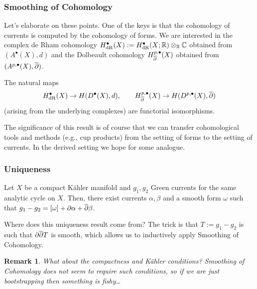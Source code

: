 \documentclass[11pt]{beamer}
\newtheorem{remark}{Remark}
\begin{document}
\begin{frame}
\frametitle{Smoothing of Cohomology}
Let's elaborate on these points. One of the keys is that the cohomology of currents is computed by the cohomology of forms. We are interested in the complex de Rham cohomology $H_{\operatorname{dR}}^{\bullet}(X):=H_{\operatorname{dR}}^{\bullet}(X;\mathbb{R})\otimes_{\mathbb{R}}\mathbb{C}$ obtained from $(A^{\bullet}(X),d)$ and the Dolbeault cohomology $H_{\overline{\partial}}^{p,\bullet}(X)$ obtained from $(A^{p,\bullet}(X),\overline{\partial})$. 

\begin{theorem}
The natural maps 
$$H_{\operatorname{dR}}^{\bullet}(X)\to H(D^{\bullet}(X),d),\qquad H_{\overline{\partial}}^{p,\bullet}(X)\to H(D^{p,\bullet}(X),\overline{\partial})$$
(arising from the underlying complexes) are functorial isomorphisms.
\end{theorem}

The significance of this result is of course that we can transfer cohomological tools and methods (e.g., cup products) from the setting of forms to the setting of currents. In the derived setting we hope for some analogue.
\end{frame}

\begin{frame}
\frametitle{Uniqueness}
\begin{theorem}
Let $X$ be a compact K\"{a}hler manifold and $g_1,g_2$ Green currents for the same analytic cycle on $X$. Then, there exist currents $\alpha,\beta$ and a smooth form $\omega$ such that $g_1-g_2=[\omega]+\partial\alpha+\overline{\partial}\beta$.
\end{theorem}

Where does this uniqueness result come from? The trick is that $T:=g_1-g_2$ is such that $\partial\overline{\partial}T$ is smooth, which allows us to inductively apply Smoothing of Cohomology. 

\begin{remark}
What about the compactness and K\"{a}hler conditions? Smoothing of Cohomology does not seem to require such conditions, so if we are just bootstrapping then something is fishy\ldots
\end{remark}
\end{frame}
\end{document}
